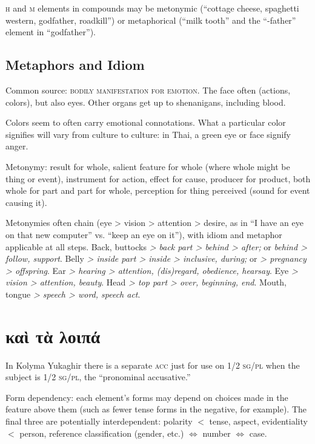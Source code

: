 \documentclass[11pt]{article}
\newcommand{\I}[1]{\textsc{#1}}   %
\begin{document}
\noindent \I{h} and \I{m} elements in compounds may be metonymic
(``cottage cheese, spaghetti western, godfather, roadkill'') or
metaphorical (``milk tooth'' and the ``-father'' element in
``godfather'').


\subsection{Metaphors and Idiom}
Common source: \I{bodily manifestation for emotion}. The face often
(actions, colors), but also eyes. Other organs get up to shenanigans,
including blood.

Colors seem to often carry emotional connotations.  What a
particular color signifies will vary from culture to culture: in Thai,
a green eye or face signify anger.

Metonymy: result for whole, salient feature for whole (where whole
might be thing or event), instrument for action, effect for cause,
producer for product, both whole for part and part for whole,
perception for thing perceived (sound for event causing it).

Metonymies often chain (eye > vision > attention > desire, as in ``I
have an eye on that new computer'' vs. ``keep an eye on it''), with
idiom and metaphor applicable at all steps.  Back, buttocks \textit{>
back part > behind > after;} or \textit{behind > follow, support}.
Belly \textit{> inside part > inside > inclusive, during;} or
\textit{> pregnancy > offspring}.  Ear \textit{> hearing > attention,
(dis)regard, obedience, hearsay}.  Eye \textit{> vision > attention,
beauty}.  Head \textit{> top part > over, beginning, end}.  Mouth,
tongue \textit{> speech > word, speech act}.




\section{καὶ τὰ λοιπά}
In Kolyma Yukaghir there is a separate \I{acc} just for use on \I{1/2
sg/pl} when the subject is \I{1/2 sg/pl}, the ``pronominal
accusative.'' 

Form dependency: each element's forms may depend on choices made in
the feature above them (such as fewer tense forms in the negative, for
example).  The final three are potentially interdependent: polarity
$<$ tense, aspect, evidentiality $<$ person, reference classification
(gender, etc.) $\Leftrightarrow$ number $\Leftrightarrow$ case.
\end{document}
